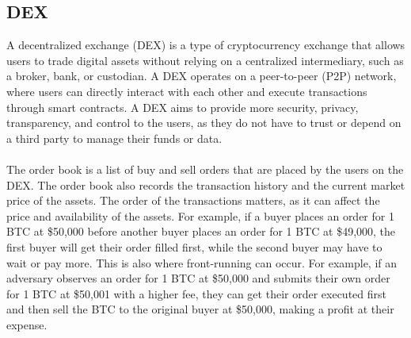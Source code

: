 \documentclass{report}
\begin{document}
\subsection{DEX}
A decentralized exchange (DEX) is a type of cryptocurrency exchange that allows users to trade digital assets without relying on a centralized intermediary, such as a broker, bank, or custodian. A DEX operates on a peer-to-peer (P2P) network, where users can directly interact with each other and execute transactions through smart contracts. A DEX aims to provide more security, privacy, transparency, and control to the users, as they do not have to trust or depend on a third party to manage their funds or data.\\\\
The order book is a list of buy and sell orders that are placed by the users on the DEX. The order book also records the transaction history and the current market price of the assets. The order of the transactions matters, as it can affect the price and availability of the assets. For example, if a buyer places an order for 1 BTC at \$50,000 before another buyer places an order for 1 BTC at \$49,000, the first buyer will get their order filled first, while the second buyer may have to wait or pay more. This is also where front-running can occur. For example, if an adversary observes an order for 1 BTC at \$50,000 and submits their own order for 1 BTC at \$50,001 with a higher fee, they can get their order executed first and then sell the BTC to the original buyer at \$50,000, making a profit at their expense.
\end{document}

